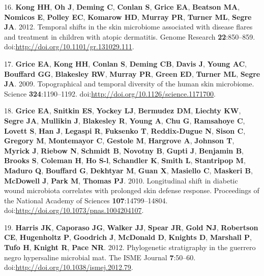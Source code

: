 \documentclass[11pt,]{article}
\begin{document}
16. \textbf{Kong HH}, \textbf{Oh J}, \textbf{Deming C}, \textbf{Conlan
S}, \textbf{Grice EA}, \textbf{Beatson MA}, \textbf{Nomicos E},
\textbf{Polley EC}, \textbf{Komarow HD}, \textbf{Murray PR},
\textbf{Turner ML}, \textbf{Segre JA}. 2012. Temporal shifts in the skin
microbiome associated with disease flares and treatment in children with
atopic dermatitis. Genome Research \textbf{22}:850--859.
doi:\url{http://doi.org/10.1101/gr.131029.111}.

17. \textbf{Grice EA}, \textbf{Kong HH}, \textbf{Conlan S},
\textbf{Deming CB}, \textbf{Davis J}, \textbf{Young AC},
\textbf{Bouffard GG}, \textbf{Blakesley RW}, \textbf{Murray PR},
\textbf{Green ED}, \textbf{Turner ML}, \textbf{Segre JA}. 2009.
Topographical and temporal diversity of the human skin microbiome.
Science \textbf{324}:1190--1192.
doi:\url{http://doi.org/10.1126/science.1171700}.

18. \textbf{Grice EA}, \textbf{Snitkin ES}, \textbf{Yockey LJ},
\textbf{Bermudez DM}, \textbf{Liechty KW}, \textbf{Segre JA},
\textbf{Mullikin J}, \textbf{Blakesley R}, \textbf{Young A}, \textbf{Chu
G}, \textbf{Ramsahoye C}, \textbf{Lovett S}, \textbf{Han J},
\textbf{Legaspi R}, \textbf{Fuksenko T}, \textbf{Reddix-Dugue N},
\textbf{Sison C}, \textbf{Gregory M}, \textbf{Montemayor C},
\textbf{Gestole M}, \textbf{Hargrove A}, \textbf{Johnson T},
\textbf{Myrick J}, \textbf{Riebow N}, \textbf{Schmidt B},
\textbf{Novotny B}, \textbf{Gupti J}, \textbf{Benjamin B},
\textbf{Brooks S}, \textbf{Coleman H}, \textbf{Ho S-l},
\textbf{Schandler K}, \textbf{Smith L}, \textbf{Stantripop M},
\textbf{Maduro Q}, \textbf{Bouffard G}, \textbf{Dekhtyar M},
\textbf{Guan X}, \textbf{Masiello C}, \textbf{Maskeri B},
\textbf{McDowell J}, \textbf{Park M}, \textbf{Thomas PJ}. 2010.
Longitudinal shift in diabetic wound microbiota correlates with
prolonged skin defense response. Proceedings of the National Academy of
Sciences \textbf{107}:14799--14804.
doi:\url{http://doi.org/10.1073/pnas.1004204107}.

19. \textbf{Harris JK}, \textbf{Caporaso JG}, \textbf{Walker JJ},
\textbf{Spear JR}, \textbf{Gold NJ}, \textbf{Robertson CE},
\textbf{Hugenholtz P}, \textbf{Goodrich J}, \textbf{McDonald D},
\textbf{Knights D}, \textbf{Marshall P}, \textbf{Tufo H}, \textbf{Knight
R}, \textbf{Pace NR}. 2012. Phylogenetic stratigraphy in the guerrero
negro hypersaline microbial mat. The ISME Journal \textbf{7}:50--60.
doi:\url{http://doi.org/10.1038/ismej.2012.79}.
\end{document}
